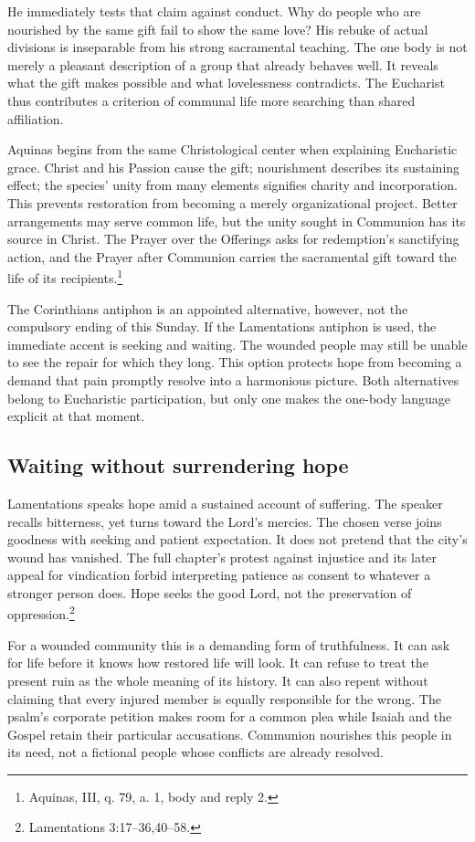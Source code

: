 He immediately tests that claim against conduct. Why do people who are nourished by the same gift fail to show the same love? His rebuke of actual divisions is inseparable from his strong sacramental teaching. The one body is not merely a pleasant description of a group that already behaves well. It reveals what the gift makes possible and what lovelessness contradicts. The Eucharist thus contributes a criterion of communal life more searching than shared affiliation.

Aquinas begins from the same Christological center when explaining Eucharistic grace. Christ and his Passion cause the gift; nourishment describes its sustaining effect; the species' unity from many elements signifies charity and incorporation. This prevents restoration from becoming a merely organizational project. Better arrangements may serve common life, but the unity sought in Communion has its source in Christ. The Prayer over the Offerings asks for redemption's sanctifying action, and the Prayer after Communion carries the sacramental gift toward the life of its recipients.\footnote{Aquinas,  III, q. 79, a. 1, body and reply 2.}

The Corinthians antiphon is an appointed alternative, however, not the compulsory ending of this Sunday. If the Lamentations antiphon is used, the immediate accent is seeking and waiting. The wounded people may still be unable to see the repair for which they long. This option protects hope from becoming a demand that pain promptly resolve into a harmonious picture. Both alternatives belong to Eucharistic participation, but only one makes the one-body language explicit at that moment.

\subsection{Waiting without surrendering hope}
Lamentations speaks hope amid a sustained account of suffering. The speaker recalls bitterness, yet turns toward the Lord's mercies. The chosen verse joins goodness with seeking and patient expectation. It does not pretend that the city's wound has vanished. The full chapter's protest against injustice and its later appeal for vindication forbid interpreting patience as consent to whatever a stronger person does. Hope seeks the good Lord, not the preservation of oppression.\footnote{Lamentations 3:17--36,40--58.}

For a wounded community this is a demanding form of truthfulness. It can ask for life before it knows how restored life will look. It can refuse to treat the present ruin as the whole meaning of its history. It can also repent without claiming that every injured member is equally responsible for the wrong. The psalm's corporate petition makes room for a common plea while Isaiah and the Gospel retain their particular accusations. Communion nourishes this people in its need, not a fictional people whose conflicts are already resolved.

